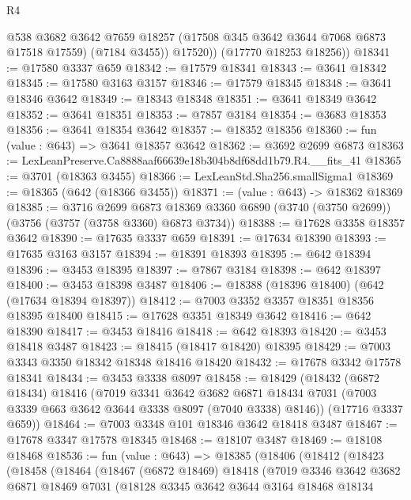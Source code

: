 \begin{lexlean}{R4}
\begin{coremodule}
            @538
            @3682
            @3642
            @7659
            @18257
            (@17508 @345 @3642 @3644 @7068 @6873 @17518 @17559)
            (@7184 @3455))
          @17520))
      (@17770 @18253 @18256))
@18341 := @17580 @3337 @659
@18342 := @17579 @18341
@18343 := @3641 @18342
@18345 := @17580 @3163 @3157
@18346 := @17579 @18345
@18348 := @3641 @18346 @3642
@18349 := @18343 @18348
@18351 := @3641 @18349 @3642
@18352 := @3641 @18351
@18353 := @7857 @3184
@18354 := @3683 @18353
@18356 := @3641 @18354 @3642
@18357 := @18352 @18356
@18360 := fun (value : @643) => @3641 @18357 @3642
@18362 := @3692 @2699 @6873
@18363 := LexLeanPreserve.Ca8888aaf66639e18b304b8df68dd1b79.R4.__fits_41
@18365 := @3701 (@18363 @3455)
@18366 := LexLeanStd.Sha256.smallSigma1
@18369 := @18365 (@642 (@18366 @3455))
@18371 := (value : @643) -> @18362 @18369
@18385 := @3716
    @2699
    @6873
    @18369
    @3360
    @6890
    (@3740 (@3750 @2699))
    (@3756 (@3757 (@3758 @3360) @6873 @3734))
@18388 := @17628 @3358 @18357 @3642
@18390 := @17635 @3337 @659
@18391 := @17634 @18390
@18393 := @17635 @3163 @3157
@18394 := @18391 @18393
@18395 := @642 @18394
@18396 := @3453 @18395
@18397 := @7867 @3184
@18398 := @642 @18397
@18400 := @3453 @18398 @3487
@18406 := @18388 (@18396 @18400) (@642 (@17634 @18394 @18397))
@18412 := @7003 @3352 @3357 @18351 @18356 @18395 @18400
@18415 := @17628 @3351 @18349 @3642
@18416 := @642 @18390
@18417 := @3453 @18416
@18418 := @642 @18393
@18420 := @3453 @18418 @3487
@18423 := @18415 (@18417 @18420) @18395
@18429 := @7003 @3343 @3350 @18342 @18348 @18416 @18420
@18432 := @17678 @3342 @17578 @18341
@18434 := @3453 @3338 @8097
@18458 := @18429
    (@18432
      (@6872 @18434)
      @18416
      (@7019
        @3341
        @3642
        @3682
        @6871
        @18434
        @7031
        (@7003 @3339 @663 @3642 @3644 @3338 @8097 (@7040 @3338) @8146))
      (@17716 @3337 @659))
@18464 := @7003 @3348 @101 @18346 @3642 @18418 @3487
@18467 := @17678 @3347 @17578 @18345
@18468 := @18107 @3487
@18469 := @18108 @18468
@18536 := fun (value : @643) =>
  @18385
    (@18406
      (@18412
        (@18423
          (@18458
            (@18464
              (@18467
                (@6872 @18469)
                @18418
                (@7019
                  @3346
                  @3642
                  @3682
                  @6871
                  @18469
                  @7031
                  (@18128
                    @3345
                    @3642
                    @3644
                    @3164
                    @18468
                    @18134

\end{coremodule}
\end{lexlean}
